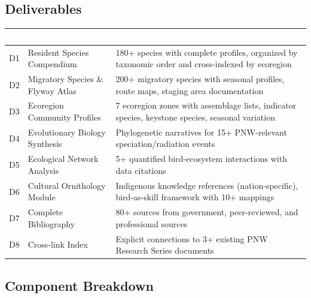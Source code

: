 \documentclass[11pt,letterpaper]{article}
\newcommand{\tableheader}[1]{\textbf{\sffamily\textcolor{white}{#1}}}
\begin{document}
\subsection{Deliverables}

\begin{center}
\begin{tabularx}{\textwidth}{C{0.5cm}L{4cm}X}
\toprule
{}
\tableheader{\#} & \tableheader{Deliverable} & \tableheader{Acceptance Criteria} \\
\midrule
D1 & Resident Species Compendium & 180+ species with complete profiles, organized by taxonomic order and cross-indexed by ecoregion \\
D2 & Migratory Species \& Flyway Atlas & 200+ migratory species with seasonal profiles, route maps, staging area documentation \\
D3 & Ecoregion Community Profiles & 7 ecoregion zones with assemblage lists, indicator species, keystone species, seasonal variation \\
D4 & Evolutionary Biology Synthesis & Phylogenetic narratives for 15+ PNW-relevant speciation/radiation events \\
D5 & Ecological Network Analysis & 5+ quantified bird-ecosystem interactions with data citations \\
D6 & Cultural Ornithology Module & Indigenous knowledge references (nation-specific), bird-as-skill framework with 10+ mappings \\
D7 & Complete Bibliography & 80+ sources from government, peer-reviewed, and professional sources \\
D8 & Cross-link Index & Explicit connections to 3+ existing PNW Research Series documents \\
\bottomrule
\end{tabularx}
\end{center}

\subsection{Component Breakdown}
\end{document}
